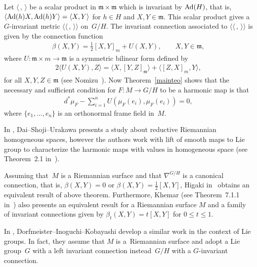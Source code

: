 \documentclass[10pt,a4paper]{amsart}
\numberwithin{equation}{section}
\newcommand{\m}{\mathfrak{m}}
\begin{document}
\begin{Example}\label{exampleriemannian}
  Let $\langle \,,\,\rangle $ be a scalar product in $\m\times \m$ which is invariant by ${\rm Ad}(H)$, that is,  $\langle {\rm Ad}(h) X, {\rm Ad}(h) Y\rangle = \langle X,Y\rangle $ for $h \in H$ and $X,Y  \in \m$.  This scalar product gives a $G$-invariant metric $\langle\langle\,,\,\rangle\rangle $ on~$G/H$. The invariant connection associated to $\langle\langle\,,\,\rangle\rangle $ is given by the connection function
  \begin{gather*}
    \beta(X,Y) = \frac{1}{2}[X,Y]_{m} + U(X,Y), \qquad X, Y \in \m,
  \end{gather*}
  where $U\colon \m\times m \rightarrow \m$ is a symmetric bilinear form def\/ined by
  \begin{gather*}
    2\langle U(X,Y),Z\rangle = \langle X, [Y,Z]_{\m}\rangle  + \langle [Z,X]_{m},Y\rangle,
  \end{gather*}
  for all $X,Y,Z \in \m$ (see Nomizu~\cite{Nomizu}). Now Theorem~\ref{mainteo} shows that the necessary and suf\/f\/icient condition for
   $F\colon  M \rightarrow G/H$ to be a harmonic map is  that
  \begin{gather*}
    d^{*}\mu_{F}  - \sum_{i=1}^{n}U(\mu_{F}(e_{i}),\mu_{F}(e_{i})) = 0,
  \end{gather*}
  where $\{ e_1, \ldots , e_n\}$ is an orthonormal frame f\/ield in~$M$.
\end{Example}

\begin{Remark}
  In \cite{DaiY/ShojiM/UrakawaH}, Dai--Shoji--Urakawa presents a study about reductive Riemannian homogeneous spaces, however the authors work with lift of smooth maps to Lie group to characterize the harmonic maps with values in homogeneous space (see Theorem~2.1 in~\cite{DaiY/ShojiM/UrakawaH}).

  Assuming that~$M$ is a Riemannian surface and that $\nabla^{G/H}$ is a   canonical  connection, that is,
  $\beta(X,Y) = 0$ or $\beta(X,Y) = \frac{1}{2}[X,Y]$, Higaki in~\cite{Higaki} obtains an equivalent result of above theorem.
  Furthermore, Khemar (see Theorem~7.1.1 in~\cite{Khemar})
  also presents an equivalent result for a Riemannian surface $M$ and a family of invariant connections  given by
  $\beta_t(X,Y) = t[X,Y]$ for $0 \leq t \leq 1$.

  In \cite{DorfmeisterJ/InoguchiJ/KobayashiS}, Dorfmeister--Inoguchi--Kobayashi develop a similar work in the context
  of Lie groups. In fact, they assume that $M$ is a~Riemannian surface  and adopt a Lie group~$G$ with a left invariant
  connection instead~$G/H$ with a $G$-invariant connection.
\end{Remark}
\end{document}
